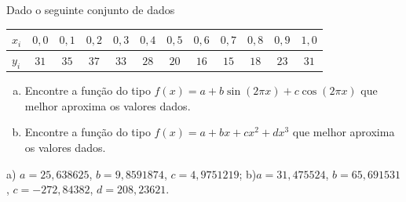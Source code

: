 \begin{exer} Dado o seguinte conjunto de dados
  \begin{center}
    \begin{tabular}{l|ccccccccccc}
      $x_i$ & $0,0$ & $0,1$ & $0,2$ & $0,3$ & $0,4$ & $0,5$ & $0,6$ & $0,7$ & $0,8$ & $0,9$ & $1,0$\\\hline
      $y_i$ & $31$ & $35$ & $37$ & $33$ & $28$ & $20$ & $16$ & $15$ & $18$ & $23$ & $31$
    \end{tabular}
  \end{center} 
\begin{enumerate}[a)]
\item Encontre a função do tipo $f(x)=a+b\sin(2\pi x)+c\cos(2\pi x)$ que melhor aproxima os valores dados.
\item Encontre a função do tipo $f(x)=a+bx+cx^2+dx^3$ que melhor aproxima os valores dados.
\end{enumerate}
\end{exer}
\begin{resp}
    a) $a=25,638625$, $b=9,8591874$, $c=4,9751219$; b)$a=31,475524$, $b=65,691531$, $c=-272,84382$, $d=208,23621$.
\end{resp}










